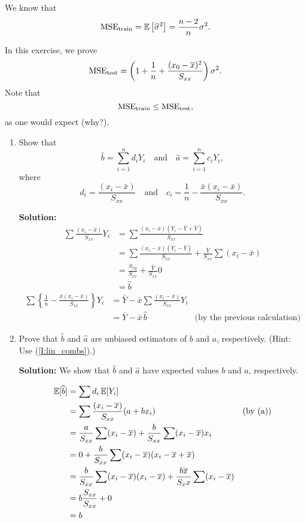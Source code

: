 \documentclass[12pt]{amsart}
\newcommand{\sol}{\bigskip\noindent\textbf{Solution: }}
\begin{document}
\begin{enumerate}
    We know that
    \[
        \operatorname{MSE}_{\text{train}} = \operatorname{\mathbb{E}}\left[\widehat{\sigma}^2\right] = \frac{n-2}n\sigma^2.
    \]
    
    In this exercise, we prove
    \[
        \operatorname{MSE}_{\text{test}} = \left(1 + \frac1n + \frac{(x_0-\overline x)^2}{S_{xx}} \right)\sigma^2.
    \]
    Note that
    \[
        \operatorname{MSE}_\text{train}\leq  \operatorname{MSE}_{\text{test}},
    \]
    as one would expect (why?).
    
    \begin{enumerate}
        \setlength\itemsep{0.5em}
        \item\label{I:lin_combs} Show that
        \[
            \hat b = \sum_{i=1}^n d_i Y_i\quad\text{and}\quad
            \hat a = \sum_{i=1}^n c_i Y_i,
        \]
        where
        \[
            d_i=\frac{(x_i-\bar x)}{S_{xx}}\quad\text{and}\quad
            c_i = \frac1n - \frac{\bar x(x_i - \bar x)}{S_{xx}}.
        \]

        \sol
        \begin{align*}
            \sum \frac{(x_i-\bar x)}{S_{xx}}Y_i &=
            \sum\frac{(x_i-\bar x)(Y_i - \bar Y + \bar Y)}{S_{xx}}\\
            &= \sum\frac{(x_i-\bar x)(Y_i - \bar Y)}{S_{xx}} + \frac{\bar{Y}}{S_{xx}}\sum(x_i - \bar x)\\
            &= \frac{S_{xy}}{S_{xx}} + \frac{\bar Y}{S_{xx}}0\\
            &= \hat b
        \end{align*}
        \begin{align*}
            \sum \left\{\frac1n - \frac{\bar x(x_i - \bar x)}{S_{xx}}\right\}Y_i &=
            \bar Y - \bar x\sum\frac{(x_i-\bar x)}{S_{xx}} Y_i \\
            &= \bar Y - \bar x\, \hat b &\text{(by the previous calculation)}
        \end{align*}

        \item\label{I:unbiased} Prove that $\hat b$ and $\hat a$ are unbiased estimators of $b$ and $a$, respectively. (Hint: Use (\ref{I:lin_combs}).)
            
        \sol We show that $\hat b$ and $\hat a$ have expected values $b$ and $a$, respectively.

        \begin{align*}
            \operatorname{\mathbb{E}}[\widehat b] &= \sum{d_i}\operatorname{\mathbb{E}}[Y_i]\\
            &= \sum\frac{(x_i-\overline x)}{S_{xx}}(a + bx_i)&\text{(by (a))}\\
            &= \frac{a}{S_{xx}}\sum(x_i-\overline x) + \frac{b}{S_{xx}}\sum (x_i - \overline x)x_i\\
            &= 0 + \frac{b}{S_{xx}}\sum (x_i - \overline x)(x_i - \overline x + \overline x)\\
            &= \frac{b}{S_{xx}}\sum (x_i - \overline x)(x_i - \overline x) + \frac {b\overline x}{S_xx}\sum (x_i - \overline x)\\
            &= b\frac{S_{xx}}{S_{xx}} + 0\\
            &= b
        \end{align*}


\end{enumerate}
\end{enumerate}
\end{document}

